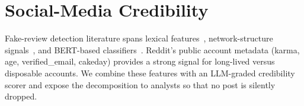\section{Social-Media Credibility}
Fake-review detection literature spans lexical features~\citep{ott2011finding},
network-structure signals~\citep{akoglu2013opinion}, and BERT-based
classifiers~\citep{zhao2023detect}.  Reddit's public account metadata
(karma, age, verified\_email, cakeday) provides a strong signal for
long-lived versus disposable accounts.  We combine these features with an
LLM-graded credibility scorer and expose the decomposition to analysts so
that no post is silently dropped.
